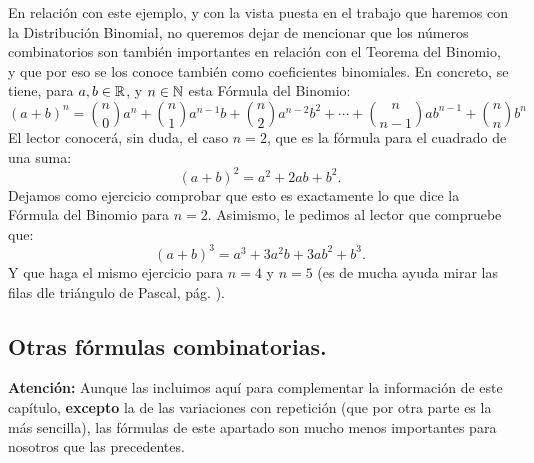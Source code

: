 En relación con este ejemplo, y con la vista puesta en el trabajo que haremos con la Distribución Binomial, no queremos dejar de mencionar que los números combinatorios son también importantes en relación con el Teorema del Binomio, y que por eso se los conoce también como {\sf coeficientes binomiales}. En concreto, se tiene, para $a,b\in\mathbb{R}$, y $n\in\mathbb{N}$ esta {\sf Fórmula del Binomio}:
 \begin{equation}\label{cap03:ecu:FormulaBinomio}
 (a+b)^n=\binom{n}{0}a^n+\binom{n}{1}a^{n-1}b+\binom{n}{2}a^{n-2}b^2+\cdots+\binom{n}{n-1}ab^{n-1}+\binom{n}{n}b^n
  \end{equation}
El lector conocerá, sin duda, el caso $n=2$, que es la fórmula para el cuadrado de una suma:
\[(a+b)^2=a^2+2ab+b^2.\]
Dejamos como ejercicio comprobar que esto es exactamente lo que dice la Fórmula del Binomio para $n=2$. Asimismo, le pedimos al lector que compruebe que:
\[(a+b)^3=a^3+3a^2b+3ab^2+b^3.\]
Y que haga el mismo ejercicio para $n=4$ y $n=5$ (es de mucha ayuda mirar las filas dle triángulo de Pascal, pág. \pageref{cap03:ecu:TrianguloPascal}).

\subsection{Otras fórmulas combinatorias.}
\label{cap03:subsec:OtrasFormulasCombinatorias}
{\bf Atención:}
Aunque las incluimos aquí para complementar la información de este capítulo, {\bf excepto} la de las variaciones con repetición (que por otra parte es la más sencilla), las fórmulas de este apartado son mucho menos importantes para nosotros que las precedentes.

